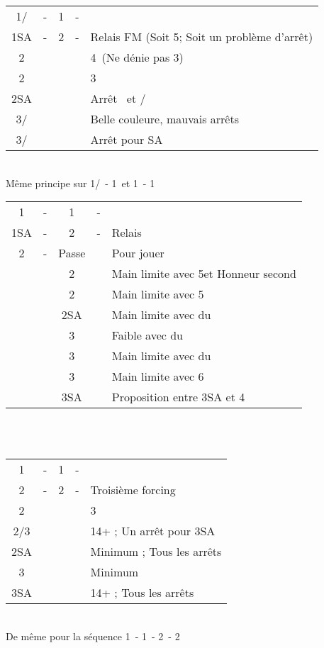 \documentclass[a4paper, oneside, 11pt]{report}
\begin{document}
	\begin{tabular}{cccc|l}
	1\trefle/\carreau & - & 1\pique & - &\\
	1SA & - & 2\carreau & - & Relais FM (Soit 5\pique ; Soit un problème d'arrêt)\\
	2\coeur &&&& 4\coeur\ (Ne dénie pas 3\pique)\\
	2\pique &&&& 3\pique\\
	2SA &&&& Arrêt \coeur\ et \carreau/\trefle\\
	3\trefle/\carreau &&&& Belle couleure, mauvais arrêts\\
	3\carreau/\trefle &&&& Arrêt pour SA\\
	\end{tabular}\\
	Même principe sur 1\trefle/\carreau\ - 1\coeur\ et 1\coeur\ - 1\pique\\

	\begin{tabular}{cccc|l}
	1\coeur & - & 1\pique & - &\\
	1SA & - & 2\trefle & - & Relais\\
	2\carreau & - & Passe && Pour jouer\\
	&& 2\coeur && Main limite avec 5\pique et Honneur second \coeur\\
	&& 2\pique && Main limite avec 5\pique\\
	&& 2SA && Main limite avec du \trefle\\
	&& 3\trefle && Faible avec du \trefle\\
	&& 3\carreau && Main limite avec du \carreau\\
	&& 3\pique && Main limite avec 6\pique\\
	&& 3SA && Proposition entre 3SA et 4\pique\\
	\end{tabular}\\\\
	
	\begin{tabular}{cccc|l}
	1\trefle & - & 1\coeur & - &\\
	2\trefle & - & 2\carreau & - & Troisième forcing\\
	2\coeur &&&& 3\coeur\\
	2\pique/3\carreau &&&& 14+ ; Un arrêt pour 3SA\\
	2SA &&&& Minimum ; Tous les arrêts\\
	3\trefle &&&& Minimum\\
	3SA &&&& 14+ ; Tous les arrêts\\
	\end{tabular}\\
	De même pour la séquence 1\carreau\ - 1\pique\ - 2\carreau\ - 2\coeur\\
		
\end{document}
